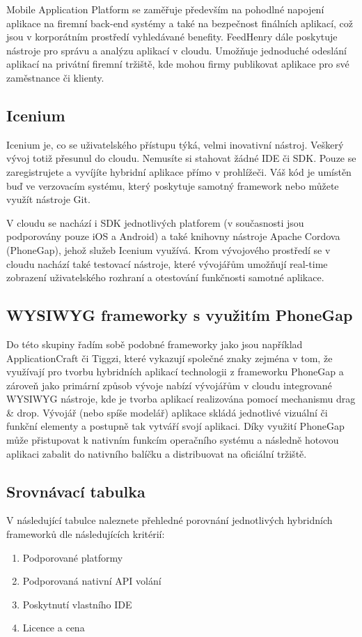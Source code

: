 Mobile Application Platform se zaměřuje především na pohodlné napojení aplikace na firemní back-end systémy a také na bezpečnost finálních aplikací, což jsou v korporátním prostředí vyhledávané benefity. FeedHenry dále poskytuje nástroje pro správu a analýzu aplikací v cloudu. Umožňuje jednoduché odeslání aplikací na privátní firemní tržiště, kde mohou firmy publikovat aplikace pro své zaměstnance či klienty.

\subsection{Icenium}
Icenium je, co se uživatelského přístupu týká, velmi inovativní nástroj. Veškerý vývoj totiž přesunul do cloudu. Nemusíte si stahovat žádné IDE či SDK. Pouze se zaregistrujete a vyvíjíte hybridní aplikace přímo v prohlížeči. Váš kód je umístěn buď ve verzovacím systému, který poskytuje samotný framework nebo můžete využít nástroje Git.

V cloudu se nachází i SDK jednotlivých platforem (v současnosti jsou podporovány pouze iOS a Android) a také knihovny nástroje Apache Cordova (PhoneGap), jehož služeb Icenium využívá. Krom vývojového prostředí se v cloudu nachází také testovací nástroje, které vývojářům umožňují real-time zobrazení uživatelského rozhraní a otestování funkčnosti samotné aplikace.

\subsection{WYSIWYG frameworky s využitím PhoneGap}
Do této skupiny řadím sobě podobné frameworky jako jsou například ApplicationCraft či Tiggzi, které vykazují společné znaky zejména v tom, že využívají pro tvorbu hybridních aplikací technologii z frameworku PhoneGap a zároveň jako primární způsob vývoje nabízí vývojářům v cloudu integrované WYSIWYG nástroje, kde je tvorba aplikací realizována pomocí mechanismu drag \& drop. Vývojář (nebo spíše modelář) aplikace skládá jednotlivé vizuální či funkční elementy a postupně tak vytváří svojí aplikaci. Díky využití PhoneGap může přistupovat k nativním funkcím operačního systému a následně hotovou aplikaci zabalit do nativního balíčku a distribuovat na oficiální tržiště.

\subsection{Srovnávací tabulka}
V následující tabulce naleznete přehledné porovnání jednotlivých hybridních frameworků dle následujících kritérií:

\begin{enumerate}
	\item Podporované platformy
	\item Podporovaná nativní API volání
	\item Poskytnutí vlastního IDE
	\item Licence a cena
\end{enumerate}

